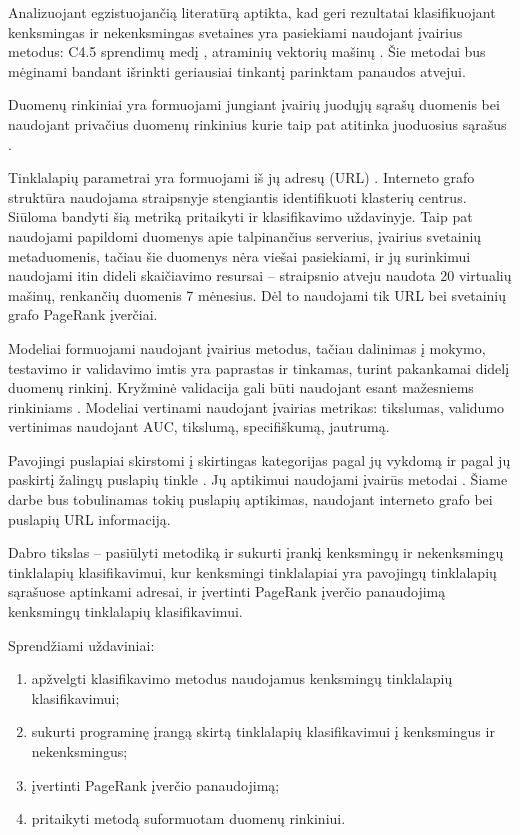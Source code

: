 
Analizuojant egzistuojančią literatūrą aptikta, kad geri rezultatai klasifikuojant kenksmingas ir nekenksmingas svetaines yra pasiekiami naudojant įvairius metodus: C4.5 sprendimų medį \cite{trees}, atraminių vektorių mašinų \cite{comp}. Šie metodai bus mėginami bandant išrinkti geriausiai tinkantį parinktam panaudos atvejui.

Duomenų rinkiniai yra formuojami jungiant įvairių juodųjų sąrašų duomenis bei naudojant privačius duomenų rinkinius kurie taip pat atitinka juoduosius sąrašus \cite{trees, comp, webcop}.

Tinklalapių parametrai yra formuojami iš jų adresų (URL) \cite{trees, comp}. Interneto grafo struktūra naudojama straipsnyje \cite{linchpins} stengiantis identifikuoti klasterių centrus. Siūloma bandyti šią metriką pritaikyti ir klasifikavimo uždavinyje. Taip pat naudojami papildomi duomenys apie talpinančius serverius, įvairius svetainių metaduomenis, tačiau šie duomenys nėra viešai pasiekiami, ir jų surinkimui naudojami itin dideli skaičiavimo resursai -- \cite{linchpins} straipsnio atveju naudota 20 virtualių mašinų, renkančių duomenis 7 mėnesius. Dėl to naudojami tik URL bei svetainių grafo PageRank įverčiai.

Modeliai formuojami naudojant įvairius metodus, tačiau dalinimas į mokymo, testavimo ir validavimo imtis yra paprastas ir tinkamas, turint pakankamai didelį duomenų rinkinį. Kryžminė validacija gali būti naudojant esant mažesniems rinkiniams \cite{trees}. Modeliai vertinami naudojant įvairias metrikas: tikslumas, validumo vertinimas naudojant AUC, tikslumą, specifiškumą, jautrumą.

\newpage
{}
Pavojingi puslapiai skirstomi į skirtingas kategorijas pagal jų vykdomą \cite{tax} ir pagal jų paskirtį žalingų puslapių tinkle \cite{linchpins}. Jų aptikimui naudojami įvairūs metodai \cite{comp}. Šiame darbe bus tobulinamas tokių puslapių aptikimas, naudojant interneto grafo bei puslapių URL informaciją.

Dabro tikslas -- pasiūlyti metodiką ir sukurti įrankį kenksmingų ir nekenksmingų tinklalapių klasifikavimui, kur kenksmingi tinklalapiai yra pavojingų tinklalapių sąrašuose aptinkami adresai, ir įvertinti PageRank įverčio panaudojimą kenksmingų tinklalapių klasifikavimui.

Sprendžiami uždaviniai:
\begin{enumerate}
    \item apžvelgti klasifikavimo metodus naudojamus kenksmingų tinklalapių klasifikavimui;
    \item sukurti programinę įrangą skirtą tinklalapių klasifikavimui į kenksmingus ir nekenksmingus;
    \item įvertinti PageRank įverčio panaudojimą;
    \item pritaikyti metodą suformuotam duomenų rinkiniui.
\end{enumerate}
